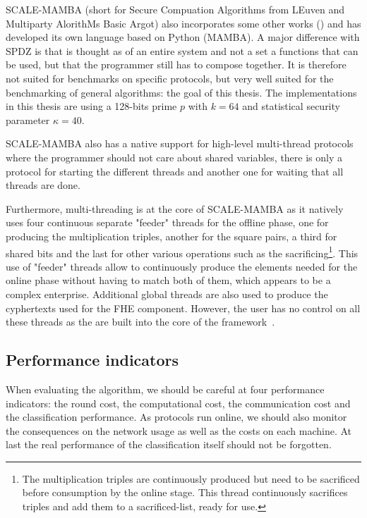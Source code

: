 SCALE-MAMBA (short for Secure Compuation Algorithms from LEuven and Multiparty AlorithMs Basic Argot) also incorporates some other works (\cite{Bendlin2011Semi-homomorphicComputation,Nielsen2012AComputation}) and has developed its own language based on Python (MAMBA). A major difference with SPDZ is that is thought as of an entire system and not a set a functions that can be used, but that the programmer still has to compose together. It is therefore not suited for benchmarks on specific protocols, but very well suited for the benchmarking of general algorithms: the goal of this thesis. The implementations in this thesis are using a 128-bits prime $p$ with $k=64$ and statistical security parameter $\kappa=40$. 

SCALE-MAMBA also has a native support for high-level multi-thread protocols where the programmer should not care about shared variables, there is only a protocol for starting the different threads and another one for waiting that all threads are done. 

Furthermore, multi-threading is at the core of SCALE-MAMBA as it natively uses four continuous separate "feeder" threads for the offline phase, one for producing the multiplication triples, another for the square pairs, a third for shared bits and the last for other various operations such as the sacrificing\footnote{The multiplication triples are continuously produced but need to be sacrificed before consumption by the online stage. This thread continuously sacrifices triples and add them to a sacrificed-list, ready for use.}. This use of "feeder" threads allow to continuously produce the elements needed for the online phase without having to match both of them, which appears to be a complex enterprise. Additional global threads are also used to produce the cyphertexts used for the FHE component. However, the user has no control on all these threads as the are built into the core of the framework~\cite{Aly2018SCALEDocumentation}.

\subsection{Performance indicators}
\label{sec:perf}
When evaluating the algorithm, we should be careful at four performance indicators: the round cost, the computational cost, the communication cost and the classification performance. As protocols run online, we should also monitor the consequences on the network usage as well as the costs on each machine. At last the real performance of the classification itself should not be forgotten. 

